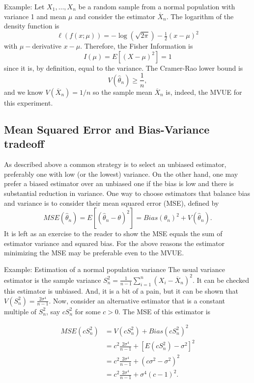 \documentclass[]{book}
\begin{document}
Example: Let \(X_1, \ldots, X_n\) be a random sample from a normal
population with variance 1 and mean \(\mu\) and consider the estimator
\(\overline X_n\). The logarithm of the density function is
\[\ell(f(x;\mu)) = -\log(\sqrt{2\pi}) - \tfrac12(x - \mu)^2\] with
\(\mu-\)derivative \(x - \mu\). Therefore, the Fisher Information is
\[I(\mu) = E[(X - \mu)^2] = 1\] since it is, by definition, equal to the
variance. The Cramer-Rao lower bound is
\[V(\hat\theta_n)\geq \frac{1}{n},\] and we know
\(V(\overline X_n) = 1/n\) so the sample mean \(\overline X_n\) is,
indeed, the MVUE for this experiment.

\subsection{Mean Squared Error and Bias-Variance
tradeoff}\label{mean-squared-error-and-bias-variance-tradeoff}

As described above a common strategy is to select an unbiased estimator,
preferably one with low (or the lowest) variance. On the other hand, one
may prefer a biased estimator over an unbiased one if the bias is low
and there is substantial reduction in variance. One way to choose
estimators that balance bias and variance is to consider their mean
squared error (MSE), defined by
\[MSE(\hat\theta_n) = E[(\hat\theta_n - \theta)^2] = Bias(\theta_n)^2 + V(\hat\theta_n).\]
It is left as an exercise to the reader to show the MSE equals the sum
of estimator variance and squared bias. For the above reasons the
estimator minimizing the MSE may be preferable even to the MVUE.

Example: Estimation of a normal population variance The usual variance
estimator is the sample variance
\(S^2_n = \frac{1}{n-1}\sum_{i=1}^n (X_i - \overline X_n)^2\). It can be
checked this estimator is unbiased. And, it is a bit of a pain, but it
can be shown that \(V(S_n^2) = \frac{2\sigma^4}{n-1}\). Now, consider an
alternative estimator that is a constant multiple of \(S^2_n\), say
\(c S_n^2\) for some \(c>0\). The MSE of this estimator is

\begin{align*}
MSE(cS_n^2) &= V(cS_n^2) + Bias(cS_n^2)^2\\
& = c^2\frac{2\sigma^4}{n-1} + [E(cS_n^2) - \sigma^2]^2\\
& = c^2\frac{2\sigma^4}{n-1} + (c\sigma^2 - \sigma^2)^2\\
& = c^2\frac{2\sigma^4}{n-1} + \sigma^4(c-1)^2.
\end{align*}
\end{document}
